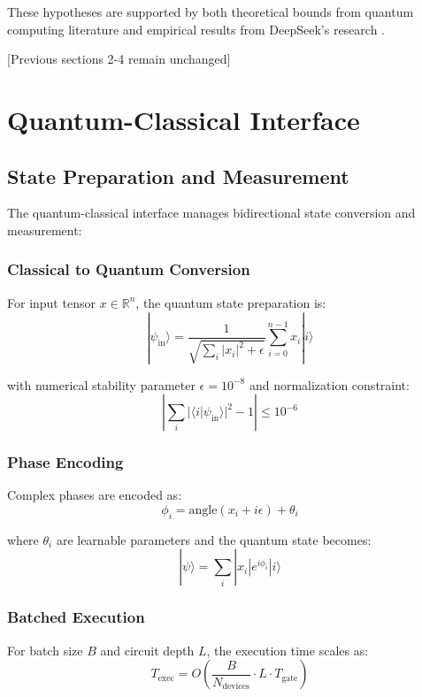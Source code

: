 \documentclass{article}
\begin{document}
These hypotheses are supported by both theoretical bounds from quantum computing literature \cite{Preskill2018quantumcomputingin, Bharti2022nobsapproach} and empirical results from DeepSeek's research \cite{DeepSeek2024}.

[Previous sections 2-4 remain unchanged]

\section{Quantum-Classical Interface}
\subsection{State Preparation and Measurement}
The quantum-classical interface manages bidirectional state conversion and measurement:

\subsubsection{Classical to Quantum Conversion}
For input tensor $x \in \mathbb{R}^n$, the quantum state preparation is:
\begin{equation}
|\psi_{\text{in}}\rangle = \frac{1}{\sqrt{\sum_i |x_i|^2 + \epsilon}} \sum_{i=0}^{n-1} x_i|i\rangle
\end{equation}

with numerical stability parameter $\epsilon=10^{-8}$ and normalization constraint:
\begin{equation}
\left|\sum_i |\langle i|\psi_{\text{in}}\rangle|^2 - 1\right| \leq 10^{-6}
\end{equation}

\subsubsection{Phase Encoding}
Complex phases are encoded as:
\begin{equation}
\phi_i = \text{angle}(x_i + i\epsilon) + \theta_i
\end{equation}

where $\theta_i$ are learnable parameters and the quantum state becomes:
\begin{equation}
|\psi\rangle = \sum_i |x_i|e^{i\phi_i}|i\rangle
\end{equation}

\subsubsection{Batched Execution}
For batch size $B$ and circuit depth $L$, the execution time scales as:
\begin{equation}
T_{\text{exec}} = O\left(\frac{B}{N_{\text{devices}}} \cdot L \cdot T_{\text{gate}}\right)
\end{equation}
\end{document}
